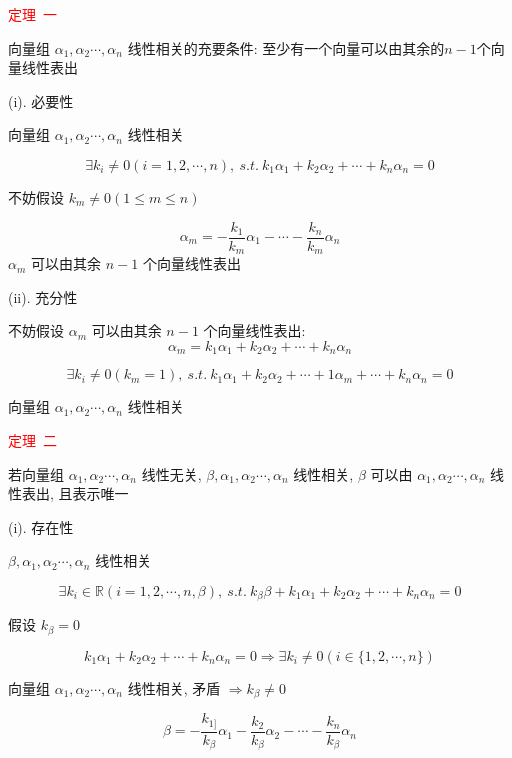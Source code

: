\begin{theorem}[判别线性相关性的七大定理]
	\textcolor{red}{定理\ 一}
	
	 向量组 $\alpha_{1},\alpha_{2}\cdots,\alpha_{n}$ 线性相关的充要条件: 至少有一个向量可以由其余的$n-1$个向量线性表出
	 
	 \begin{anymark}[证明]
	 	(i). 必要性
	 	
	 	向量组 $\alpha_{1},\alpha_{2}\cdots,\alpha_{n}$ 线性相关
	 	
		$$\exists k_{i}\neq 0(i=1,2,\cdots,n),\ s.t.\ k_{1}\alpha_{1}+k_{2}\alpha_{2}+\cdots+k_{n}\alpha_{n}=0$$
	 	
		不妨假设 $k_{m}\neq 0(1\leq m\leq n)$

	 	$$\alpha_{m}=-\dfrac{k_{1}}{k_{m}}\alpha_{1}-\cdots-\dfrac{k_{n}}{k_{m}}\alpha_{n}$$
	 	$\alpha_{m}$ 可以由其余 $n-1$ 个向量线性表出
	 	
	 	(ii). 充分性
	 	
	 	不妨假设 $\alpha_{m}$ 可以由其余 $n-1$ 个向量线性表出:  
	 	$$\alpha_{m}=k_{1}\alpha_{1}+k_{2}\alpha_{2}+\cdots+k_{n}\alpha_{n}$$
	 	
		$$\exists k_{i}\neq 0(k_{m} = 1),\ s.t. \ k_{1}\alpha_{1} + k_{2}\alpha_{2}+\cdots + 1\alpha_{m} + \cdots + k_{n}\alpha_{n}=0$$
	 	
		向量组 $\alpha_{1},\alpha_{2}\cdots,\alpha_{n}$ 线性相关
	 \end{anymark}

	\textcolor{red}{定理\ 二}
	
	若向量组 $\alpha_{1},\alpha_{2}\cdots,\alpha_{n}$ 线性无关, $\beta,\alpha_{1},\alpha_{2}\cdots,\alpha_{n}$ 线性相关, 
	$\beta$ 可以由 $\alpha_{1},\alpha_{2}\cdots,\alpha_{n}$ 线性表出, 且表示唯一
	\begin{anymark}[证明]
		(i). 存在性
		
		$\beta,\alpha_{1},\alpha_{2}\cdots,\alpha_{n}$ 线性相关

		$$\exists k_{i}\in\mathbb{R}(i = 1,2,\cdots,n,\beta),\ s.t. \ k_{\beta}\beta + k_{1}\alpha_{1} + k_{2}\alpha_{2} + \cdots+k_{n}\alpha_{n} = 0$$

		假设 $k_{\beta}=0$  
		
		$$k_{1}\alpha_{1}+k_{2}\alpha_{2}+\cdots+k_{n}\alpha_{n} = 0\Rightarrow \exists k_{i}\neq 0 (i\in \{1,2,\cdots,n\})$$
		
		向量组 $\alpha_{1},\alpha_{2}\cdots,\alpha_{n}$ 线性相关, 矛盾 $\Rightarrow k_{\beta} \neq 0$
		
		$$\beta = -\dfrac{k_{1]}}{k_{\beta}} \alpha_{1} - \dfrac{k_{2}}{k_{\beta}} \alpha_{2} - \cdots - \dfrac{k_{n}}{k_{\beta}}\alpha_{n}$$


\end{anymark}
\end{theorem}
